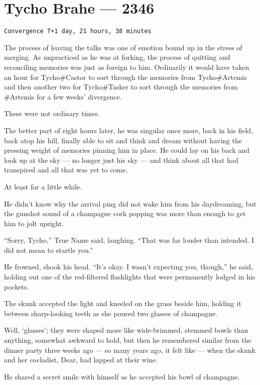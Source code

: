 \hypertarget{tycho-brahe-2346}{%
\chapter{Tycho Brahe — 2346}\label{tycho-brahe-2346}}

\begin{verbatim}
Convergence T+1 day, 21 hours, 38 minutes
\end{verbatim}

The process of leaving the talks was one of emotion bound up in the stress of merging. As unpracticed as he was at forking, the process of quitting and reconciling memories was just as foreign to him. Ordinarily it would have taken an hour for Tycho\#Castor to sort through the memories from Tycho\#Artemis and then another two for Tycho\#Tasker to sort through the memories from \#Artemis for a few weeks' divergence.

These were not ordinary times.

The better part of eight hours later, he was singular once more, back in his field, back atop his hill, finally able to sit and think and dream without having the pressing weight of memories pinning him in place. He could lay on his back and look up at the sky — no longer just his sky — and think about all that had transpired and all that was yet to come.

At least for a little while.

He didn't know why the arrival ping did not wake him from his daydreaming, but the gunshot sound of a champagne cork popping was more than enough to get him to jolt upright.

``Sorry, Tycho,'' True Name said, laughing. ``That was far louder than intended. I did not mean to startle you.''

He frowned, shook his head. ``It's okay. I wasn't expecting you, though,'' he said, holding out one of the red-filtered flashlights that were permanently lodged in his pockets.

The skunk accepted the light and kneeled on the grass beside him, holding it between sharp-looking teeth as she poured two glasses of champagne.

Well, `glasses'; they were shaped more like wide-brimmed, stemmed bowls than anything, somewhat awkward to hold, but then he remembered similar from the dinner party three weeks ago — so many years ago, it felt like — when the skunk and her cocladist, Dear, had lapped at their wine.

He shared a secret smile with himself as he accepted his bowl of champagne.

